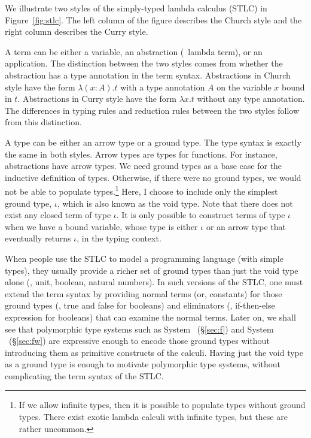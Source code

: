 We illustrate two styles of the simply-typed lambda calculus (STLC)
in Figure~\ref{fig:stlc}. The left column of the figure describes
the Church style and the right column describes the Curry style.

A term can be either a variable, an abstraction (\aka\ lambda term), or
an application. The distinction between the two styles comes from whether
the abstraction has a type annotation in the term syntax. Abstractions in
Church style have the form $\lambda(x:A).t$ with a type annotation $A$ on
the variable $x$ bound in $t$. Abstractions in Curry style have the form
$\lambda x.t$ without any type annotation. The differences in typing rules
and reduction rules between the two styles follow from this distinction.

A type can be either an arrow type or a ground type.
The type syntax is exactly the same in both styles.
Arrow types are types for functions. For instance,
abstractions have arrow types. We need ground types as a base case for
the inductive definition of types. Otherwise, if there were no ground types,
we would not be able to populate types.\footnote{
	If we allow infinite types,
	then it is possible to populate types without ground types.
	There exist exotic lambda calculi with infinite types, but
	these are rather uncommon.}
Here, I choose to include only the simplest ground type, $\iota$, which is
also known as the void type. Note that there does not exist any closed term
of type $\iota$. It is only possible to construct terms of type $\iota$ when
we have a bound variable, whose type is either $\iota$ or an arrow type that
eventually returns $\iota$, in the typing context.

When people use the STLC to model a programming language (with simple types),
they usually provide a richer set of ground types than just the void type alone
(\eg, unit, boolean, natural numbers). In such versions of the STLC, 
one must extend the term syntax by providing normal terms (or, constants) for
those ground types (\eg, \textsf{true} and \textsf{false} for booleans) and
eliminators (\eg, if-then-else expression for booleans) that can examine
the normal terms. Later on, we shall see that polymorphic type systems
such as System \F\ (\S\ref{sec:f}) and System \Fw\ (\S\ref{sec:fw}) are
expressive enough to encode those ground types without introducing them
as primitive constructs of the calculi. Having just the void type as
a ground type is enough to motivate polymorphic type systems, without
complicating the term syntax of the STLC.

